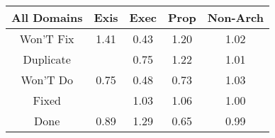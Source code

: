 \begin{tabular}{|c||c|c|c|c|}
\hline
All Domains & Exis & Exec & Prop & Non-Arch \\ 
\hline
Won'T Fix & \cellcolor[rgb]{0.53,0.66,0.42} 1.41 & \cellcolor[rgb]{0.76,0.13,0.28} 0.43 & \cellcolor[rgb]{0.7227480014012974,0.7513016848742987,0.42} 1.20 & \cellcolor[rgb]{0.8882641330508783,0.8297040630241002,0.42} 1.02 \\ 
\hline
Duplicate &  & \cellcolor[rgb]{0.8445772082854679,0.5303321192178811,0.3589387277331033} 0.75 & \cellcolor[rgb]{0.7081457302435037,0.744384819589028,0.42} 1.22 & \cellcolor[rgb]{0.9000543604075155,0.8352889075614546,0.42} 1.01 \\ 
\hline
Won'T Do & \cellcolor[rgb]{0.8439057424578615,0.527153847633878,0.3583120262940041} 0.75 & \cellcolor[rgb]{0.7728716825557869,0.19092596409739107,0.2920135703854011} 0.48 & \cellcolor[rgb]{0.8389222741162425,0.503565430816881,0.35366078917515964} 0.73 & \cellcolor[rgb]{0.8846003083143843,0.8279685670962872,0.42} 1.03 \\ 
\hline
Fixed &  & \cellcolor[rgb]{0.880943241070905,0.8262362720862182,0.42} 1.03 & \cellcolor[rgb]{0.853042077059945,0.8130199312389212,0.42} 1.06 & \cellcolor[rgb]{0.9095592807193628,0.8379139287383167,0.41958866200473854} 1.00 \\ 
\hline
Done & \cellcolor[rgb]{0.8796289096638283,0.6962435057421208,0.3916536490195731} 0.89 & \cellcolor[rgb]{0.6372880293147987,0.7108206454649046,0.42} 1.29 & \cellcolor[rgb]{0.8183794245739457,0.4063292763166761,0.33448746293568266} 0.65 & \cellcolor[rgb]{0.9069069207319805,0.825359424798041,0.4171131260165151} 0.99 \\ 
\hline
\end{tabular}